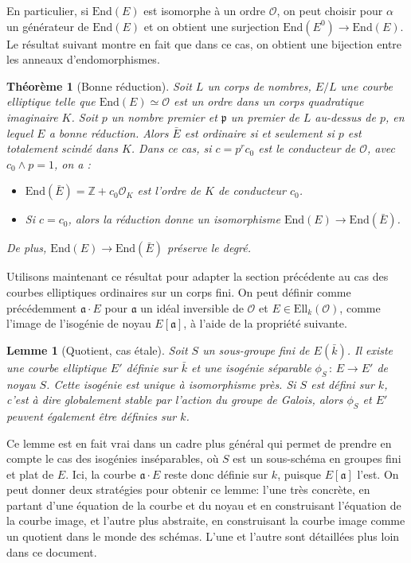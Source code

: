 \documentclass[11pt,a4paper]{article}
\newcommand{\Z}{\mathbb{Z}}
\renewcommand{\O}{\mathcal{O}}
\newcommand{\vers}{\longrightarrow}
\newcommand{\End}{\mathrm{End}}
\newcommand{\Ell}{\mathrm{Ell}}
\renewcommand{\frak}{\mathfrak}
\newcommand{\de}{\,:\,}
\newtheorem*{thm}{Théorème}
\newtheorem*{lem}{Lemme}
\theoremstyle{definition}
\begin{document}
En particulier, si $\End(E)$ est isomorphe à un ordre $\O$, on peut choisir pour $\alpha$ un générateur de $\End(E)$ et on obtient une surjection $\End(E^0)\vers \End(E).$ Le résultat suivant montre en fait que dans ce cas, on obtient une bijection entre les anneaux d'endomorphismes.

\begin{thm}[Bonne réduction]

Soit $L$ un corps de nombres, $E/L$ une courbe elliptique telle que $\End(E)\simeq \O$ est un ordre dans un corps quadratique imaginaire $K$. Soit $p$ un nombre premier et $\frak p$ un premier de $L$ au-dessus de $p$, en lequel $E$ a bonne réduction. Alors $\bar{E}$ est ordinaire si et seulement si $p$ est totalement scindé dans $K$. Dans ce cas, si $c=p^r c_0$ est le conducteur de $\O$, avec $c_0 \wedge p = 1$, on a :

\begin{itemize}
\item[(i)] $\End(\bar{E})=\Z+c_0 \O_K$ est l'ordre de $K$ de conducteur $c_0$.
\item[(ii)] Si $c=c_0$, alors la réduction donne un isomorphisme $\End(E)\vers\End(\bar{E})$.
\end{itemize}
De plus, $\End(E)\vers\End(\bar{E})$ préserve le degré.

\end{thm}

Utilisons maintenant ce résultat pour adapter la section précédente au cas des courbes elliptiques ordinaires sur un corps fini. On peut définir comme précédemment $\frak a\cdot E$ pour $\frak a$ un idéal inversible de $\O$ et $E\in \Ell_k(\O)$, comme l'image de l'isogénie de noyau $E[\frak a]$, à l'aide de la propriété suivante.

\begin{lem}[Quotient, cas étale] Soit $S$ un sous-groupe fini de $E(\bar{k})$. Il existe une courbe elliptique $E'$ définie sur $\bar{k}$ et une isogénie séparable $\phi_S\de E\vers E'$ de noyau $S$. Cette isogénie est unique à isomorphisme près. Si $S$ est défini sur $k$, c'est à dire globalement stable par l'action du groupe de Galois, alors $\phi_S$ et $E'$ peuvent également être définies sur $k$.
\end{lem} 

Ce lemme est en fait vrai dans un cadre plus général qui permet de prendre en compte le cas des isogénies inséparables, où $S$ est un sous-schéma en groupes fini et plat de $E$. Ici, la courbe $\frak a\cdot E$ reste donc définie sur $k$, puisque $E[\frak a]$ l'est. On peut donner deux stratégies pour obtenir ce lemme: l'une très concrète, en partant d'une équation de la courbe et du noyau et en construisant l'équation de la courbe image, et l'autre plus abstraite, en construisant la courbe image comme un quotient dans le monde des schémas. L'une et l'autre sont détaillées plus loin dans ce document.
\end{document}
